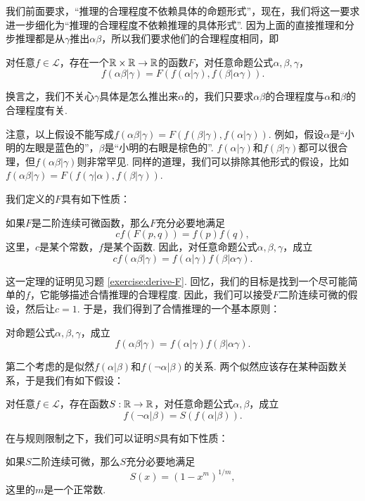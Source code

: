 我们前面要求，“推理的合理程度不依赖具体的命题形式”，现在，我们将这一要求进一步细化为“推理的合理程度不依赖推理的具体形式”. 因为上面的直接推理和分步推理都是从$\gamma$推出$\alpha\beta$，所以我们要求他们的合理程度相同，即

\begin{hypothesis}\label{hypothesis:form-of-F}
    对任意$f\in\mathcal L$，存在一个$\mathbb{R}\times\mathbb{R}\to\mathbb{R}$的函数$F$，对任意命题公式$\alpha,\beta,\gamma$，
    \[
        f(\alpha\beta|\gamma)=F(f(\alpha|\gamma),f(\beta|\alpha\gamma)).
    \]
\end{hypothesis}

换言之，我们不关心$\gamma$具体是怎么推出来$\alpha$的，我们只要求$\alpha\beta$的合理程度与$\alpha$和$\beta$的合理程度有关. 

注意，以上假设不能写成$f(\alpha\beta|\gamma) = F(f(\beta|\gamma), f(\alpha|\gamma))$. 例如，假设$\alpha$是“小明的左眼是蓝色的”，$\beta$是“小明的右眼是棕色的”. $f(\alpha|\gamma)$和$f(\beta|\gamma)$都可以很合理，但$f(\alpha\beta|\gamma)$则非常罕见. 同样的道理，我们可以排除其他形式的假设，比如$f(\alpha\beta|\gamma) = F(f(\gamma|\alpha), f(\beta|\gamma))$.

我们定义的$F$具有如下性质：
\begin{theorem}\label{theorem:form-of-F}
    如果$F$是二阶连续可微函数，那么$F$充分必要地满足
        \[cf(F(p,q))=f(p)f(q),\]
        这里，$c$是某个常数，$f$是某个函数.
        因此，对任意命题公式$\alpha,\beta,\gamma$，成立
        \[cf(\alpha\beta|\gamma)=f(\alpha|\gamma)f(\beta|\alpha\gamma).\]
\end{theorem}

这一定理的证明见习题 \ref{exercise:derive-F}. 回忆，我们的目标是找到一个尽可能简单的$f$，它能够描述合情推理的合理程度. 因此，我们可以接受$F$二阶连续可微的假设，然后让$c=1$. 于是，我们得到了合情推理的一个基本原则：
\begin{principle}[与规则]
对命题公式$\alpha,\beta,\gamma$，成立
\[f(\alpha\beta|\gamma)=f(\alpha|\gamma)f(\beta|\alpha\gamma).\]
\end{principle}

第二个考虑的是似然$f(\alpha|\beta)$和$f(\neg\alpha|\beta)$的关系. 两个似然应该存在某种函数关系，于是我们有如下假设：

\begin{hypothesis}
    对任意$f\in\mathcal L$，存在函数$S:\mathbb{R}\to\mathbb{R}$，对任意命题公式$\alpha,\beta$，成立
    \[f(\neg\alpha|\beta)=S(f(\alpha|\beta)).\]
\end{hypothesis}

在与规则限制之下，我们可以证明$S$具有如下性质：
\begin{theorem}\label{theorem:form-of-S}
    如果$S$二阶连续可微，那么$S$充分必要地满足
    \begin{equation*}
        S(x) = (1 - x^m)^{1/m},
    \end{equation*}
    这里的$m$是一个正常数.
\end{theorem}

